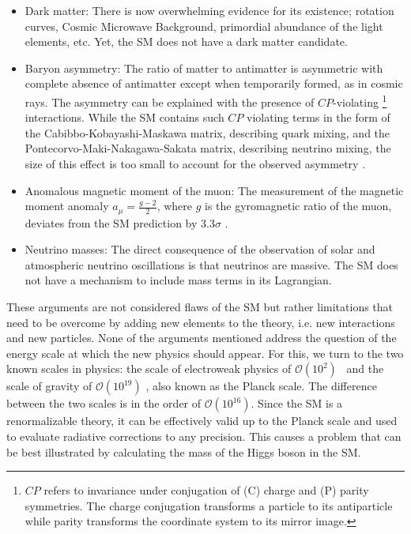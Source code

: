 \begin{itemize}
\item Dark matter: There is now overwhelming evidence for its existence; rotation curves, Cosmic Microwave Background, primordial abundance of the light elements, etc. 
Yet, the SM does not have a dark matter candidate\cite{Bertone:2004pz}.
\item Baryon asymmetry: The ratio of matter to antimatter is asymmetric with complete absence of antimatter except 
when temporarily formed, as in cosmic rays.
The asymmetry can be explained with the presence of $CP$-violating
\footnote{$CP$ refers to invariance under conjugation of (C) charge and (P) parity symmetries. 
The charge conjugation transforms a particle to its antiparticle while parity transforms the coordinate system to its mirror image.}
interactions. While the SM contains such $CP$ violating terms in the form of the
Cabibbo-Kobayashi-Maskawa matrix, describing  quark mixing, and the Pontecorvo-Maki-Nakagawa-Sakata matrix, describing neutrino 
mixing, the size of this effect is too small to account for the observed asymmetry \cite{Canetti:2012zc}.
\item Anomalous magnetic moment of the muon: The measurement of the magnetic moment anomaly $a_\mu = \frac{g-2}{2}$, where $g$ is the gyromagnetic ratio of the muon, 
deviates from the SM prediction by 3.3$\sigma$ \cite{PhysRevD.73.072003,Hagiwara:2011af}.
\item Neutrino masses: The direct consequence of the observation of solar and atmospheric neutrino oscillations is that neutrinos are massive. The SM does not have a mechanism to include 
mass terms in its Lagrangian\cite{pdg}.
\end{itemize}
These arguments are not considered flaws of the SM but rather limitations that need to be overcome by adding new elements to the theory, i.e. new interactions and new particles.
None of the arguments mentioned address the question of the energy scale at which the new physics should appear.
For this, we turn to the two known scales in physics: the scale of electroweak physics of $\mathcal{O}\left(10^2\right)$ \GeV~and the scale of gravity of $\mathcal{O}\left(10^{19}\right)$ \GeV,
also known as the Planck scale.
The difference between the two scales is in the order of $\mathcal{O}\left(10^{16}\right)$. 
Since the SM is a renormalizable theory, it can be effectively valid up to the Planck scale and 
used to evaluate radiative corrections to any precision.
This causes a problem that can be best illustrated by calculating the mass of the Higgs boson in the SM.
